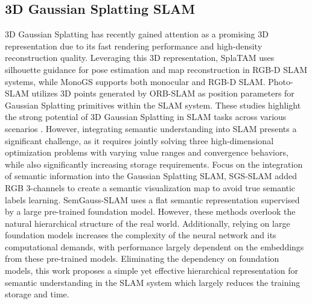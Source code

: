 \subsection{3D Gaussian Splatting SLAM}
    3D Gaussian Splatting has recently gained attention as a promising 3D representation due to its fast rendering performance and high-density reconstruction quality. 
    Leveraging this 3D representation, SplaTAM \cite{keetha2023splatam} uses silhouette guidance for pose estimation and map reconstruction in RGB-D SLAM systems, while MonoGS \cite{matsuki2024gaussian} supports both monocular and RGB-D SLAM. 
    Photo-SLAM \cite{huang2024photo} utilizes 3D points generated by ORB-SLAM as position parameters for Gaussian Splatting primitives within the SLAM system.
    These studies highlight the strong potential of 3D Gaussian Splatting in SLAM tasks across various scenarios \cite{keetha2023splatam, matsuki2024gaussian, yan2024gs, huang2024photo, yugay2023gaussian}. 
    However, integrating semantic understanding into SLAM presents a significant challenge, as it requires jointly solving three high-dimensional optimization problems with varying value ranges and convergence behaviors, while also significantly increasing storage requirements. 
    Focus on the integration of semantic information into the Gaussian Splatting SLAM, SGS-SLAM \cite{li2024sgs} added RGB 3-channels to create a semantic visualization map to avoid true semantic labels learning.
    SemGauss-SLAM \cite{zhu2024semgauss} uses a flat semantic representation supervised by a large pre-trained foundation model. However, these methods overlook the natural hierarchical structure of the real world. Additionally, relying on large foundation models increases the complexity of the neural network and its computational demands, with performance largely dependent on the embeddings from these pre-trained models.
    Eliminating the dependency on foundation models, this work proposes a simple yet effective hierarchical representation for semantic understanding in the SLAM system which largely reduces the training storage and time. 


